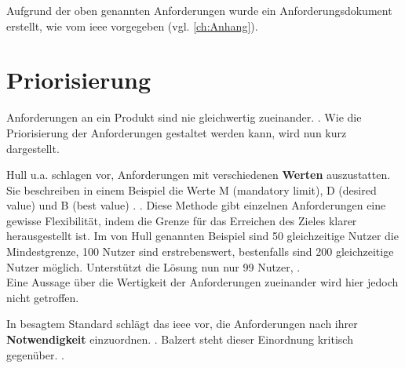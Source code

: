 Aufgrund der oben genannten Anforderungen wurde ein Anforderungsdokument erstellt, wie vom \ac{ieee} vorgegeben (vgl. \autoref{ch:Anhang}). 

\section{Priorisierung}

Anforderungen an ein Produkt sind nie gleichwertig zueinander. 
 \citep[][83]{Hull2010}. Wie die Priorisierung der Anforderungen gestaltet werden kann, wird nun kurz dargestellt.

Hull u.a. schlagen vor, Anforderungen mit verschiedenen \textbf{Werten} auszustatten. Sie beschreiben in einem Beispiel die Werte M (mandatory limit), D (desired value) und B (best value) \citep[vgl.][83]{Hull2010}.  \citep[][83]{Hull2010}.
Diese Methode gibt einzelnen Anforderungen eine gewisse Flexibilität, indem die Grenze für das Erreichen des Zieles klarer herausgestellt ist. Im von Hull \ua genannten Beispiel sind 50 gleichzeitige Nutzer die Mindestgrenze, 100 Nutzer sind erstrebenswert, bestenfalls sind 200 gleichzeitige Nutzer möglich. Unterstützt die Lösung nun nur 99 Nutzer,  \citep[][83]{Hull2010}.\\
Eine Aussage über die Wertigkeit der Anforderungen zueinander wird hier jedoch nicht getroffen. 

In besagtem Standard schlägt das \ac{ieee} vor, die Anforderungen nach ihrer \textbf{Notwendigkeit} einzuordnen.  \citep[][7]{ieee1998}. Balzert steht dieser Einordnung kritisch gegenüber.  \citep[][543]{Balzert2010}.

